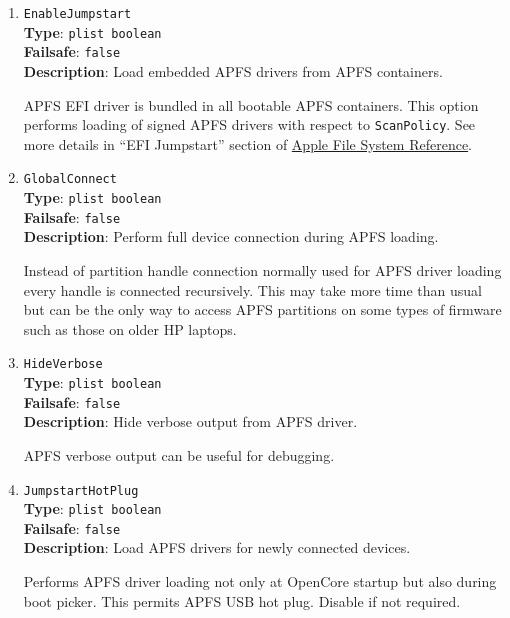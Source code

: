 \documentclass[]{article}
\begin{document}
\begin{enumerate}

\item
  \texttt{EnableJumpstart}\\
  \textbf{Type}: \texttt{plist\ boolean}\\
  \textbf{Failsafe}: \texttt{false}\\
  \textbf{Description}: Load embedded APFS drivers from APFS containers.

  APFS EFI driver is bundled in all bootable APFS containers. This
  option performs loading of signed APFS drivers with respect to
  \texttt{ScanPolicy}. See more details in ``EFI Jumpstart'' section of
  \href{https://developer.apple.com/support/apple-file-system/Apple-File-System-Reference.pdf}{Apple File System Reference}.


\item
  \texttt{GlobalConnect}\\
  \textbf{Type}: \texttt{plist\ boolean}\\
  \textbf{Failsafe}: \texttt{false}\\
  \textbf{Description}: Perform full device connection during APFS loading.

  Instead of partition handle connection normally used for APFS driver loading
  every handle is connected recursively. This may take more time than usual
  but can be the only way to access APFS partitions on some types of firmware such as
  those on older HP laptops.

\item
  \texttt{HideVerbose}\\
  \textbf{Type}: \texttt{plist\ boolean}\\
  \textbf{Failsafe}: \texttt{false}\\
  \textbf{Description}: Hide verbose output from APFS driver.

  APFS verbose output can be useful for debugging.

\item
  \texttt{JumpstartHotPlug}\\
  \textbf{Type}: \texttt{plist\ boolean}\\
  \textbf{Failsafe}: \texttt{false}\\
  \textbf{Description}: Load APFS drivers for newly connected devices.

  Performs APFS driver loading not only at OpenCore startup but also
  during boot picker. This permits APFS USB hot plug. Disable if not
  required.


\end{enumerate}
\end{document}
